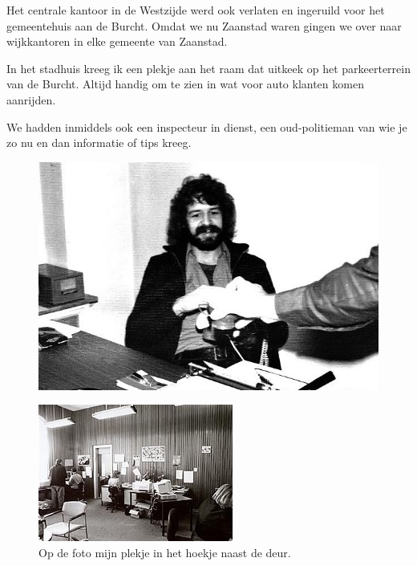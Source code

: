 \documentclass[10pt,twoside, openright]{memoir}
\begin{document}
Het centrale kantoor in de Westzijde werd ook verlaten en ingeruild voor het gemeentehuis aan de Burcht. Omdat we nu Zaanstad waren gingen we over naar wijkkantoren in elke gemeente van Zaanstad. 

In het stadhuis kreeg ik een plekje aan het raam dat uitkeek op het parkeerterrein van de Burcht. Altijd handig om te zien in wat voor auto klanten komen aanrijden. 

We hadden inmiddels ook een inspecteur in dienst, een oud-politieman van wie je zo nu en dan informatie of tips kreeg. 


\begin{figure}
\includegraphics[width=\textwidth]{img/ch42/IMG_0001}
\end{figure}

\begin{figure}
\includegraphics[width=\textwidth]{img/ch42/gem}
\caption*{\footnotesize Op de foto mijn plekje in het hoekje naast de deur.}
\end{figure}
\end{document}
